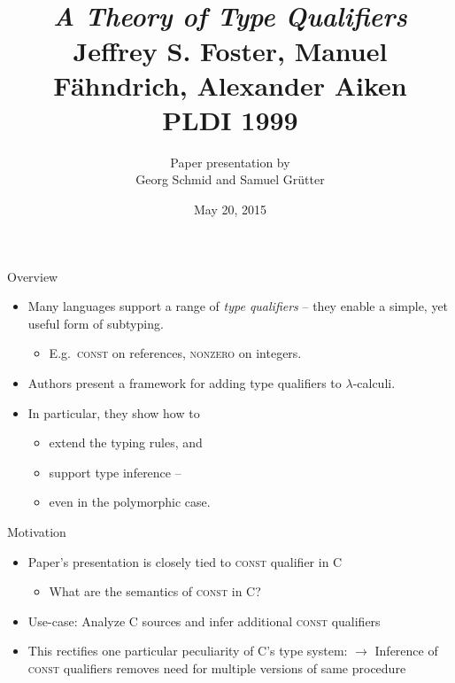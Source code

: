 \documentclass{beamer}
\title{\\\emph{A Theory of Type Qualifiers}\\ 
\small{}Jeffrey S. Foster, Manuel Fähndrich, Alexander Aiken\\
PLDI 1999}
\author{Paper presentation by\\Georg Schmid and Samuel Grütter}
\date{May 20, 2015}
\begin{document}
\maketitle

\begin{frame}{Overview}
  \begin{itemize}
  \item Many languages support a range of \emph{type qualifiers} -- 
    they enable a simple, yet useful form of subtyping.\\
    \begin{itemize}\item E.g.\ \textsc{const} on references, \textsc{nonzero} on integers.\end{itemize}

  \item Authors present a framework for adding type qualifiers to $\lambda$-calculi.

  \item In particular, they show how to
    \begin{itemize}
    \item extend the typing rules, and
    \item support type inference --
    \item even in the polymorphic case.
    \end{itemize}
  \end{itemize}
\end{frame}



\begin{frame}[fragile]{Motivation}
  \begin{itemize}
  \item Paper's presentation is closely tied to \textsc{const} qualifier in C
    \begin{itemize}\item What are the semantics of \textsc{const} in C?\end{itemize}

  \item<2-> Use-case: Analyze C sources and infer additional \textsc{const} qualifiers

  \item<3->
    This rectifies one particular peculiarity of C's type system:
    \lstcduplicateprocs
    $\rightarrow$ Inference of \textsc{const} qualifiers removes need for multiple versions of same procedure
  \end{itemize}
\end{frame}
\end{document}
